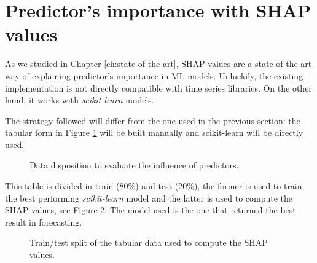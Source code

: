 \section{Predictor's importance with SHAP values}
As we studied in Chapter \ref{ch:state-of-the-art}, SHAP values are a state-of-the-art way of explaining predictor's importance in ML models. Unluckily, the existing implementation \cite{shap-package} is not directly compatible with time series libraries. On the other hand, it works with \textit{scikit-learn} models.

The strategy followed will differ from the one used in the previous section: the tabular form in Figure \ref{fig:shap-arrangement} will be built manually and scikit-learn will be directly used.

\begin{figure}[H]
\centering
    \caption{Data disposition to evaluate the influence of predictors.}
    \label{fig:shap-arrangement}
\end{figure}

This table is divided in train (80\%) and test (20\%), the former is used to train the best performing \textit{scikit-learn} model and the latter is used to compute the SHAP values, see Figure \ref{fig:shap-train-test}. The model used is the one that returned the best result in forecasting.

\begin{figure}[H]
\centering
    \caption{Train/test split of the tabular data used to compute the SHAP values.}
    \label{fig:shap-train-test}
\end{figure}


